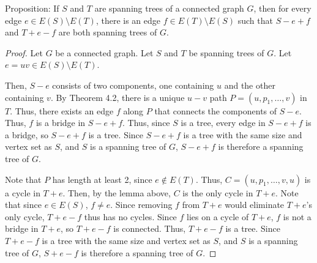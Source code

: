 \documentclass[12pt]{article}
\begin{document}
Proposition: If $S$ and $T$ are spanning trees of a connected graph $G$, then for every edge $e \in E(S) \setminus E(T)$, there is an edge $f \in E(T) \setminus E(S)$ such that $S-e+f$ and $T+e-f$ are both spanning trees of $G$.
\begin{proof}
    Let $G$ be a connected graph.
    Let $S$ and $T$ be spanning trees of $G$.
    Let $e=uv \in E(S) \setminus E(T)$.

    Then, $S - e$ consists of two components, one containing $u$ and the other containing $v$.
    By Theorem 4.2, there is a unique $u-v$ path $P = (u, p_1, \hdots, v)$ in $T$.
    Thus, there exists an edge $f$ along $P$ that connects the components of $S - e$.
    Thus, $f$ is a bridge in $S - e + f$.
    Thus, since $S$ is a tree, every edge in $S-e+f$ is a bridge, so $S-e+f$ is a tree.
    Since $S-e+f$ is a tree with the same size and vertex set as $S$, and $S$ is a spanning tree of $G$, $S-e+f$ is therefore a spanning tree of $G$.

    Note that $P$ has length at least 2, since $e \notin E(T)$.
    Thus, $C = (u, p_1, \hdots, v, u)$ is a cycle in $T+e$.
    Then, by the lemma above, $C$ is the only cycle in $T+e$.
    Note that since $e \in E(S)$, $f \neq e$.
    Since removing $f$ from $T+e$ would eliminate $T+e$'s only cycle, $T+e-f$ thus has no cycles.
    Since $f$ lies on a cycle of $T+e$, $f$ is not a bridge in $T+e$, so $T+e-f$ is connected.
    Thus, $T+e-f$ is a tree.
    Since $T+e-f$ is a tree with the same size and vertex set as $S$, and $S$ is a spanning tree of $G$, $S+e-f$ is therefore a spanning tree of $G$.
\end{proof}
\end{document}
